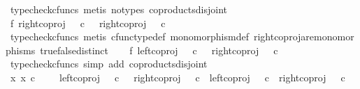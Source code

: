 \begin{isabellebody}
\ {\isacharparenleft}{\kern0pt}typecheck{\isacharunderscore}{\kern0pt}cfuncs{\isacharcomma}{\kern0pt}\ metis\ {\isacharparenleft}{\kern0pt}no{\isacharunderscore}{\kern0pt}types{\isacharparenright}{\kern0pt}\ coproducts{\isacharunderscore}{\kern0pt}disjoint{\isacharparenright}{\kern0pt}\isanewline
\ \ \isamarkupfalse%
\ f{}{\isacharcolon}{\kern0pt}\ {\isachardoublequoteopen}{\isacharparenleft}{\kern0pt}right{\isacharunderscore}{\kern0pt}coproj\ {\isasymOmega}\ {\isasymOmega}{\isacharparenright}{\kern0pt}\ {\isasymcirc}\isactrlsub c\ {\isasymt}\ {\isasymnoteq}\ {\isacharparenleft}{\kern0pt}right{\isacharunderscore}{\kern0pt}coproj\ {\isasymOmega}\ {\isasymOmega}{\isacharparenright}{\kern0pt}\ {\isasymcirc}\isactrlsub c\ {\isasymf}{\isachardoublequoteclose}\isanewline
\ \ \ \ \isamarkupfalse%
\ {\isacharparenleft}{\kern0pt}typecheck{\isacharunderscore}{\kern0pt}cfuncs{\isacharcomma}{\kern0pt}\ metis\ cfunc{\isacharunderscore}{\kern0pt}type{\isacharunderscore}{\kern0pt}def\ monomorphism{\isacharunderscore}{\kern0pt}def\ right{\isacharunderscore}{\kern0pt}coproj{\isacharunderscore}{\kern0pt}are{\isacharunderscore}{\kern0pt}monomorphisms\ true{\isacharunderscore}{\kern0pt}false{\isacharunderscore}{\kern0pt}distinct{\isacharparenright}{\kern0pt}\isanewline
\ \ \isamarkupfalse%
\ f{}{\isacharcolon}{\kern0pt}\ {\isachardoublequoteopen}{\isacharparenleft}{\kern0pt}left{\isacharunderscore}{\kern0pt}coproj\ {\isasymOmega}\ {\isasymOmega}{\isacharparenright}{\kern0pt}\ {\isasymcirc}\isactrlsub c\ {\isasymf}\ {\isasymnoteq}\ {\isacharparenleft}{\kern0pt}right{\isacharunderscore}{\kern0pt}coproj\ {\isasymOmega}\ {\isasymOmega}{\isacharparenright}{\kern0pt}\ {\isasymcirc}\isactrlsub c\ {\isasymf}{\isachardoublequoteclose}\isanewline
\ \ \ \ \isamarkupfalse%
\ {\isacharparenleft}{\kern0pt}typecheck{\isacharunderscore}{\kern0pt}cfuncs{\isacharcomma}{\kern0pt}\ simp\ add{\isacharcolon}{\kern0pt}\ coproducts{\isacharunderscore}{\kern0pt}disjoint{\isacharparenright}{\kern0pt}\isanewline
\ \ \isanewline
\ \ \isamarkupfalse%
\ {\isachardoublequoteopen}{\isacharbraceleft}{\kern0pt}x{\isachardot}{\kern0pt}\ x\ {\isasymin}\isactrlsub c\ {\isasymOmega}\ {\isasymCoprod}\ {\isasymOmega}{\isacharbraceright}{\kern0pt}\ {\isacharequal}{\kern0pt}\ {\isacharbraceleft}{\kern0pt}{\isacharparenleft}{\kern0pt}left{\isacharunderscore}{\kern0pt}coproj\ {\isasymOmega}\ {\isasymOmega}{\isacharparenright}{\kern0pt}\ {\isasymcirc}\isactrlsub c\ {\isasymt}\ {\isacharcomma}{\kern0pt}\ {\isacharparenleft}{\kern0pt}right{\isacharunderscore}{\kern0pt}coproj\ {\isasymOmega}\ {\isasymOmega}{\isacharparenright}{\kern0pt}\ {\isasymcirc}\isactrlsub c\ {\isasymt}{\isacharcomma}{\kern0pt}\ {\isacharparenleft}{\kern0pt}left{\isacharunderscore}{\kern0pt}coproj\ {\isasymOmega}\ {\isasymOmega}{\isacharparenright}{\kern0pt}\ {\isasymcirc}\isactrlsub c\ {\isasymf}{\isacharcomma}{\kern0pt}\ {\isacharparenleft}{\kern0pt}right{\isacharunderscore}{\kern0pt}coproj\ {\isasymOmega}\ {\isasymOmega}{\isacharparenright}{\kern0pt}\ {\isasymcirc}\isactrlsub c\ {\isasymf}{\isacharbraceright}{\kern0pt}{\isachardoublequoteclose}\isanewline

\end{isabellebody}
